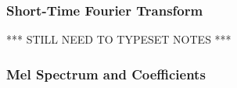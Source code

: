 \subsubsection{Short-Time Fourier Transform}
*** STILL NEED TO TYPESET NOTES ***


\subsubsection{Mel Spectrum and Coefficients}
\subsubsection{}
\subsubsection{}